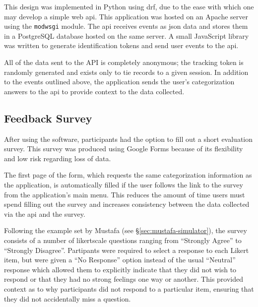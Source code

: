 \documentclass[bsc,twoside,singlespacing,parskip,logo,notimes,normalheadings]{infthesis}
\begin{document}
        This design was implemented in Python using
        \gls{drf}\cite{drf}, due to the ease with which one may
        develop a simple web \gls{api}. This application was hosted on
        an Apache server using the {\tt mod\textunderscore{}wsgi}
        module. The \gls{api} receives events as \gls{json} data and
        stores them in a PostgreSQL database hosted on the same
        server. A small JavaScript library was written to generate
        identification tokens and send user events to the \gls{api}.

        All of the data sent to the API is completely anonymous; the
        tracking token is randomly generated and exists only to tie
        records to a given session. In addition to the events outlined
        above, the application sends the user's categorization answers
        to the \gls{api} to provide context to the data collected.

        \subsection{Feedback Survey}
        After using the software, participants had the option to fill
        out a short evaluation survey. This survey was produced using
        Google Forms\cite{googleforms} because of its flexibility and
        low risk regarding loss of data.

        The first page of the form, which requests the same
        categorization information as the application, is
        automatically filled if the user follows the link to the
        survey from the application's main menu. This reduces the
        amount of time users must spend filling out the survey and
        increases consistency between the data collected via the
        \gls{api} and the survey.

        Following the example set by Mustafa\cite{mustafa2010} (see
        \S\ref{sec:mustafa-simulator}), the survey consists of a
        number of \gls{likertscale} questions ranging from ``Strongly
        Agree'' to ``Strongly Disagree''. Partipants were required to
        select a response to each Likert item, but were given a ``No
        Response'' option instead of the usual ``Neutral'' response
        which allowed them to explicitly indicate that they did not
        wish to respond or that they had no strong feelings one way or
        another. This provided context as to why participants did not
        respond to a particular item, ensuring that they did not
        accidentally miss a question.
\end{document}
